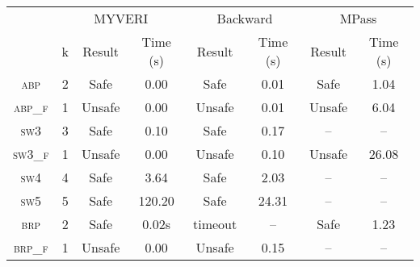 \begin{table}
\begin{tabular}{| c || c | c | c || c | c || c | c | }
\hline & \multicolumn{3}{c||}{MYVERI} & \multicolumn{2}{c||}{Backward} & \multicolumn{2}{c||}{MPass} \\
\cline {2-8} & k & Result & Time (s) & Result & Time (s) & Result & Time (s) \\
\hline
\textsc{abp} & 2 & Safe & 0.00 & Safe &  0.01 & Safe & 1.04\\
\hline
\textsc{abp\_f} & 1 & Unsafe & 0.00 & Unsafe & 0.01 & Unsafe & 6.04\\
\hline
\textsc{sw3} & 3 & Safe & 0.10 & Safe & 0.17 & -- & --\\
\hline
\textsc{sw3\_f} & 1 & Unsafe & 0.00 & Unsafe & 0.10 & Unsafe & 26.08\\
\hline
\textsc{sw4} & 4 & Safe & 3.64 & Safe & 2.03 & -- & --\\
\hline
\textsc{sw5} & 5 & Safe & 120.20 & Safe & 24.31 & -- & --\\
\hline
\textsc{brp} & 2 & Safe & 0.02s & timeout & -- & Safe & 1.23\\
\hline
\textsc{brp\_f} & 1 & Unsafe & 0.00 & Unsafe & 0.15 & -- & --\\
\hline
\end{tabular}
\end{table}

